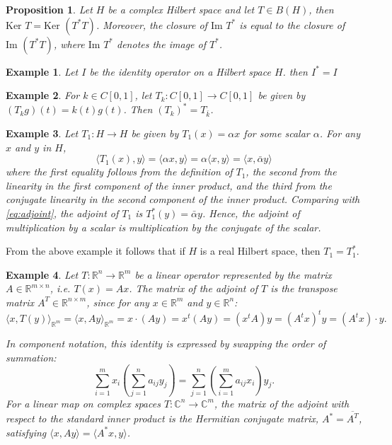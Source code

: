 \documentclass{report}
\newtheorem{exm}{Example}
\newtheorem{prop}{Proposition}
\begin{document}
\begin{prop}
Let $H$ be a complex Hilbert space and let $T \in B(H)$, then $\text{Ker } T = \text{Ker } (T^*T)$.
Moreover, the closure of $\text{Im } T^*$ is equal to the closure of $\text{Im } (T^*T)$, where $\text{Im } T^*$ denotes the image of $T^*$.
\end{prop}

\begin{exm}
Let $I$ be the identity operator on a Hilbert space $H$. then $I^{*}=I$
\end{exm}

\begin{exm}
For $k \in C[0,1]$, let $T_{k}: C[0,1] \rightarrow C[0,1]$ be given by $(T_{k}g)(t)=k(t) g(t)$.
Then $\left(T_{k}\right)^{*}=T_{\bar{k}}$.
\end{exm}

\begin{exm}
Let $T_1:H \rightarrow H$ be given by $T_1(x) = \alpha x$ for some scalar $\alpha$. For any $x$ and $y$ in $H$,
$$
\langle T_1(x), y \rangle = \langle \alpha x, y \rangle = \alpha \langle x, y \rangle = \langle x, \bar{\alpha} y \rangle
$$
where the first equality follows from the definition of $T_1$, the second from the linearity in the first component of the inner product, and the third from the conjugate linearity in the second component of the inner product. Comparing with \eqref{eq:adjoint}, the adjoint of $T_1$ is $T_1^{*}(y) = \bar{\alpha}y$. Hence, the adjoint of multiplication by a scalar is multiplication by the conjugate of the scalar.
\end{exm}

From the above example it follows that if $H$ is a real Hilbert space, then $T_1= T_1^{*}$.


\begin{exm}
    Let $T: \mathbb{R}^{n} \to \mathbb{R}^{m}$ be a linear operator represented by the matrix $A \in \mathbb{R}^{m \times n}$, i.e. $T(x)=Ax$. The matrix of the adjoint of $T$ is the transpose matrix $A^{T} \in \mathbb{R}^{n \times m}$, since for any $x \in \mathbb{R}^{m}$ and $y \in \mathbb{R}^{n}$:
    $$\langle  x, T(y) \rangle_{\mathbb{R}^{m}} = \langle  x, Ay \rangle_{\mathbb{R}^{m}} = x \cdot (Ay) = x^t (Ay) = (x^t A) y = (A^t x)^t y = (A^{t}x) \cdot y.$$ 


    In component notation, this identity is expressed by swapping the order of summation:  %
    $$ %
    \sum_{i=1}^{m} x_{i} \left( \sum_{j=1}^{n} a_{ij}y_{j} \right) = \sum_{j=1}^{n} \left( \sum_{i=1}^{m} a_{ij}x_{i} \right) y_{j}. %
    $$ %
    For a linear map on complex spaces $T: \mathbb{C}^{n} \to \mathbb{C}^{m}$, the matrix of the adjoint with respect to the standard inner product is the Hermitian conjugate matrix, $A^{*} = \overline{A^{T}}$, satisfying $\langle x, Ay \rangle = \langle A^* x, y \rangle$. %
\end{exm}
\end{document}
